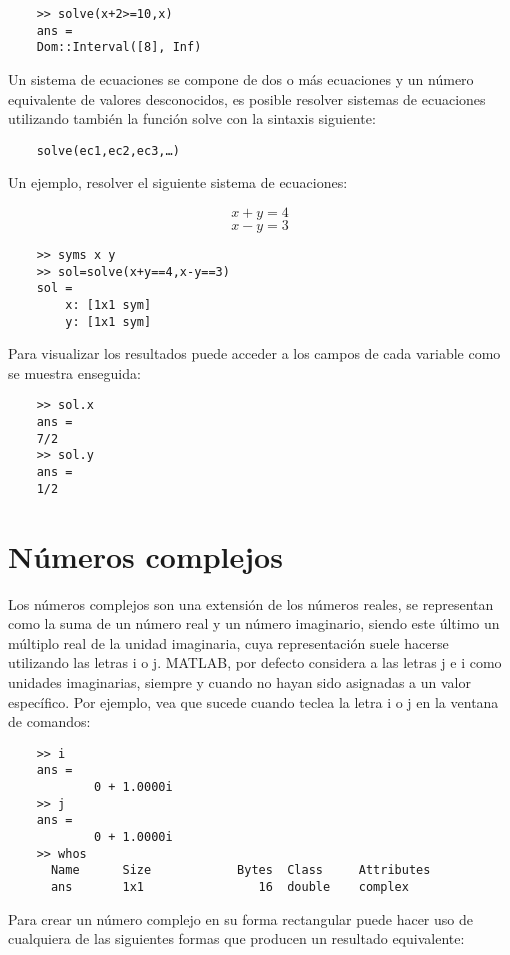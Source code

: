 \begin{verbatim}
	>> solve(x+2>=10,x)
	ans =
	Dom::Interval([8], Inf)
\end{verbatim}

Un sistema de ecuaciones se compone de dos o más ecuaciones y un número equivalente de 
valores desconocidos, es posible resolver sistemas de ecuaciones utilizando también la 
función solve con la sintaxis siguiente:

\begin{verbatim}
	solve(ec1,ec2,ec3,…)
\end{verbatim}

Un ejemplo, resolver el siguiente sistema de ecuaciones:

$$ x+y=4 $$
$$ x-y=3 $$

\begin{verbatim}
	>> syms x y
	>> sol=solve(x+y==4,x-y==3)
	sol = 
	    x: [1x1 sym]
	    y: [1x1 sym]
\end{verbatim}

Para visualizar los resultados puede acceder a los campos de cada variable como se muestra enseguida:

\begin{verbatim}
	>> sol.x 
	ans =
	7/2
	>> sol.y
	ans =
	1/2
\end{verbatim}

\section{Números complejos}

Los números complejos  son una extensión de los números reales, se representan como la 
suma de un número real y un número imaginario, siendo este último un múltiplo real de la 
unidad imaginaria, cuya representación suele hacerse utilizando las letras i o j. MATLAB, 
por defecto considera a las letras j e i como unidades imaginarias, siempre y cuando no hayan 
sido asignadas a un valor específico. Por ejemplo, vea que sucede cuando teclea la letra 
i o j en la ventana de comandos:

\begin{verbatim}
	>> i
	ans =
	        0 + 1.0000i
	>> j
	ans =
	        0 + 1.0000i
	>> whos
	  Name      Size            Bytes  Class     Attributes
	  ans       1x1                16  double    complex   
\end{verbatim}

Para crear un número complejo en su forma rectangular puede hacer uso de cualquiera de 
las siguientes formas que producen un resultado equivalente:

